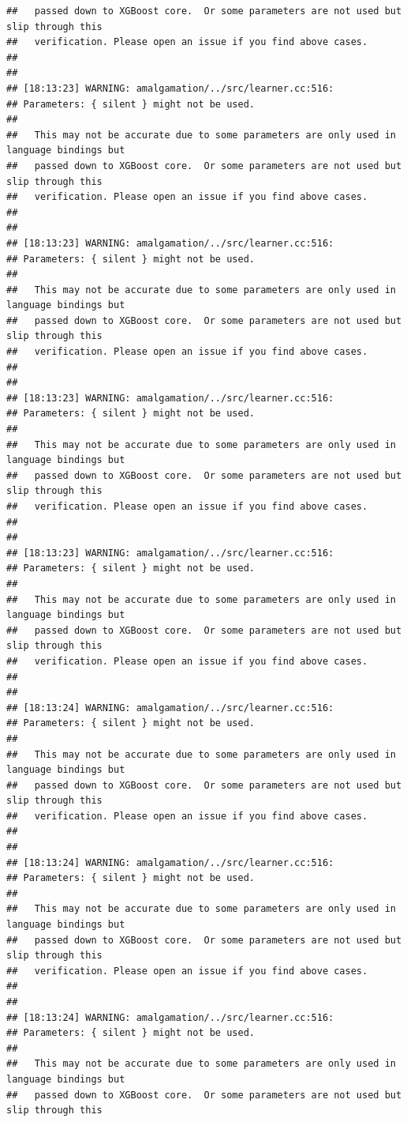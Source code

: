 \documentclass[AMS,STIX2COL]{WileyNJD-v2}\usepackage[]{graphicx}\usepackage[]{color}
\makeatletter
\newenvironment{kframe}{%
 \def\at@end@of@kframe{}%
 \ifinner\ifhmode%
  \def\at@end@of@kframe{\end{minipage}}%
  \begin{minipage}{\columnwidth}%
 \fi\fi%
 \def\FrameCommand##1{\hskip\@totalleftmargin \hskip-\fboxsep
 \colorbox{shadecolor}{##1}\hskip-\fboxsep
     \hskip-\linewidth \hskip-\@totalleftmargin \hskip\columnwidth}%
 \MakeFramed {\advance\hsize-\width
   \@totalleftmargin\z@ \linewidth\hsize
   \@setminipage}}%
 {\par\unskip\endMakeFramed%
 \at@end@of@kframe}
\newenvironment{knitrout}{}{} %
\makeatother
\begin{document}
\begin{knitrout}
\begin{kframe}
\begin{verbatim}
##   passed down to XGBoost core.  Or some parameters are not used but slip through this
##   verification. Please open an issue if you find above cases.
## 
## 
## [18:13:23] WARNING: amalgamation/../src/learner.cc:516: 
## Parameters: { silent } might not be used.
## 
##   This may not be accurate due to some parameters are only used in language bindings but
##   passed down to XGBoost core.  Or some parameters are not used but slip through this
##   verification. Please open an issue if you find above cases.
## 
## 
## [18:13:23] WARNING: amalgamation/../src/learner.cc:516: 
## Parameters: { silent } might not be used.
## 
##   This may not be accurate due to some parameters are only used in language bindings but
##   passed down to XGBoost core.  Or some parameters are not used but slip through this
##   verification. Please open an issue if you find above cases.
## 
## 
## [18:13:23] WARNING: amalgamation/../src/learner.cc:516: 
## Parameters: { silent } might not be used.
## 
##   This may not be accurate due to some parameters are only used in language bindings but
##   passed down to XGBoost core.  Or some parameters are not used but slip through this
##   verification. Please open an issue if you find above cases.
## 
## 
## [18:13:23] WARNING: amalgamation/../src/learner.cc:516: 
## Parameters: { silent } might not be used.
## 
##   This may not be accurate due to some parameters are only used in language bindings but
##   passed down to XGBoost core.  Or some parameters are not used but slip through this
##   verification. Please open an issue if you find above cases.
## 
## 
## [18:13:24] WARNING: amalgamation/../src/learner.cc:516: 
## Parameters: { silent } might not be used.
## 
##   This may not be accurate due to some parameters are only used in language bindings but
##   passed down to XGBoost core.  Or some parameters are not used but slip through this
##   verification. Please open an issue if you find above cases.
## 
## 
## [18:13:24] WARNING: amalgamation/../src/learner.cc:516: 
## Parameters: { silent } might not be used.
## 
##   This may not be accurate due to some parameters are only used in language bindings but
##   passed down to XGBoost core.  Or some parameters are not used but slip through this
##   verification. Please open an issue if you find above cases.
## 
## 
## [18:13:24] WARNING: amalgamation/../src/learner.cc:516: 
## Parameters: { silent } might not be used.
## 
##   This may not be accurate due to some parameters are only used in language bindings but
##   passed down to XGBoost core.  Or some parameters are not used but slip through this

\end{verbatim}
\end{kframe}
\end{knitrout}
\end{document}
